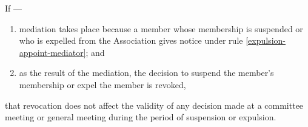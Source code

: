 \documentclass[../constitution.tex]{subfiles}
\begin{document}
If ---

\begin{enumerate}
  \def\labelenumi{\alph{enumi})}
  \setcounter{enumi}{0}
  \item mediation takes place because a member whose membership is suspended or who is expelled from the Association gives notice under rule \ref{expulsion-appoint-mediator}; and
  \item as the result of the mediation, the decision to suspend the member's membership or expel the member is revoked,
\end{enumerate}

that revocation does not affect the validity of any decision made at a committee meeting or general meeting during the period of suspension or expulsion.
\end{document}
